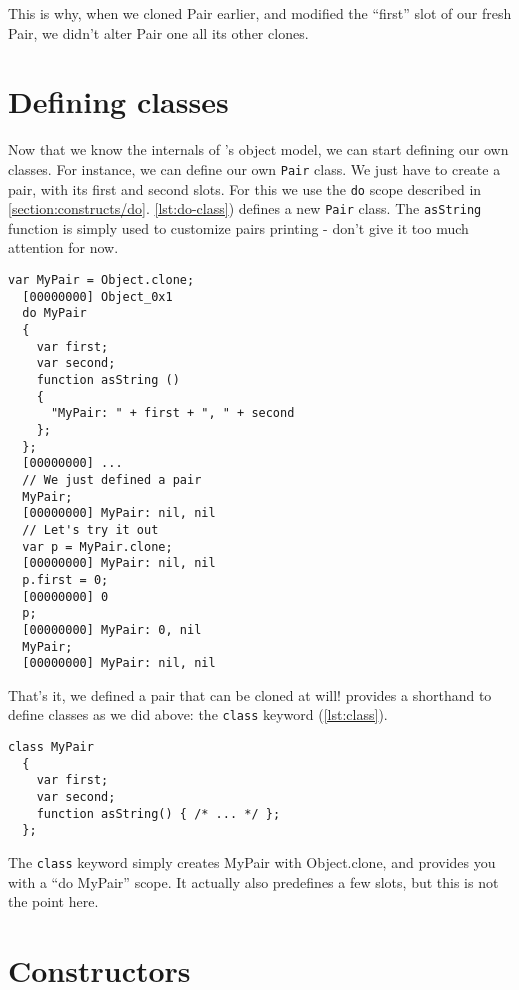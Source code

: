 \documentclass[openright,twoside,12pt]{report}
\newcommand{\lst}[1]{\autoref{lst:#1}}
\begin{document}
This is why, when we cloned Pair earlier, and modified the ``first''
slot of our fresh Pair, we didn't alter Pair one all its other clones.

\section{Defining classes}

Now that we know the internals of \urbi's object model, we can start
defining our own classes. For instance, we can define our own
\texttt{Pair} class. We just have to create a pair, with its first and
second slots. For this we use the \texttt{do} scope described in
\autoref{section:constructs/do}. \lst{do-class}) defines a new
\texttt{Pair} class. The \texttt{asString} function is simply used to
customize pairs printing - don't give it too much attention for now.

\begin{lstlisting}[caption=Defining our own \texttt{MyPair} class,
  label=lst:do-class]
  var MyPair = Object.clone;
  [00000000] Object_0x1
  do MyPair
  {
    var first;
    var second;
    function asString ()
    {
      "MyPair: " + first + ", " + second
    };
  };
  [00000000] ...
  // We just defined a pair
  MyPair;
  [00000000] MyPair: nil, nil
  // Let's try it out
  var p = MyPair.clone;
  [00000000] MyPair: nil, nil
  p.first = 0;
  [00000000] 0
  p;
  [00000000] MyPair: 0, nil
  MyPair;
  [00000000] MyPair: nil, nil
\end{lstlisting}

That's it, we defined a pair that can be cloned at will! \urbi
provides a shorthand to define classes as we did above: the
\texttt{class} keyword (\lst{class}).

\begin{lstlisting}[caption=Using the \texttt{class} construct,
  label=lst:class]
  class MyPair
  {
    var first;
    var second;
    function asString() { /* ... */ };
  };
\end{lstlisting}

The \texttt{class} keyword simply creates MyPair with Object.clone,
and provides you with a ``do MyPair'' scope. It actually also
predefines a few slots, but this is not the point here.

\section{Constructors}
\end{document}
